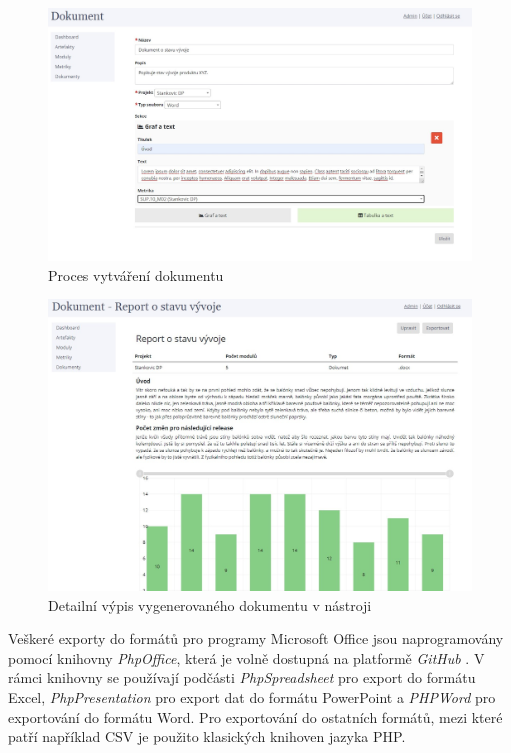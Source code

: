 \documentclass[czech,master,public,dept460,male,cpdeclaration,oneside]{diploma}
\begin{document}
\begin{figure}[!ht]
    \centering
    \includegraphics[width=1\textwidth]{Diplomka/Figures/report_document.jpg}
    \caption{Proces vytváření dokumentu}
    \label{fig:report_document}
\end{figure}

\begin{figure}[!ht]
    \centering
    \includegraphics[width=1\textwidth]{Diplomka/Figures/report_document_detail.jpg}
    \caption{Detailní výpis vygenerovaného dokumentu v nástroji}
    \label{fig:report_document_detail}
\end{figure}

Veškeré exporty do formátů pro programy Microsoft Office jsou naprogramovány pomocí knihovny \textit{PhpOffice}, která je volně dostupná na platformě \textit{GitHub} \cite{ref:phpoffice}. V rámci knihovny se používají podčásti \textit{PhpSpreadsheet} pro export do formátu Excel, \textit{PhpPresentation} pro export dat do formátu PowerPoint a \textit{PHPWord} pro exportování do formátu Word. Pro exportování do ostatních formátů, mezi které patří například CSV je použito klasických knihoven jazyka PHP.
\end{document}
